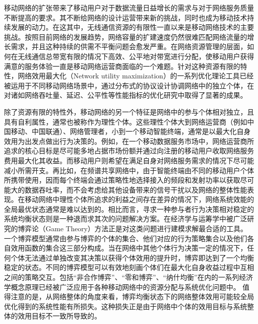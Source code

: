 
移动网络的扩张带来了移动用户对于数据流量日益增长的需求与对于网络服务质量不断提高的要求。其不断给网络的设计运营带来新的挑战，同时也成为移动技术持续发展的动力。在这其中，无线通信资源的有限性一直以来是移动网络技术的主要挑战。按照目前网络的发展趋势，网络容量的扩建速度仍然很难匹配网络流量的增长需求，并且这种持续的供需不平衡问题会愈发严重。在网络资源管理的层面，如何在无线通信总带宽有限的情况下高效、公平地对带宽进行分配，使移动用户获得满意的服务体验一直是移动网络运营商面临的一个难题。针对这种资源有限的特性，网络效用最大化（Network utility maximization）的一系列优化理论工具已经被运用于不同移动网络场景中，通过分布式的协议设计协调网络中的独立个体，在对诸如网络吞吐量、延迟、公平性等性能指标的优化研究中取得了显著的成果\cite{NET}。

除了资源有限的特性外，移动网络的另一个特征是网络中的参与个体相对独立，且具有自利属性，通常也被称作为理性个体。这些理性个体大到网络运营商（例如中国移动、中国联通）、网络管理者，小到一个移动智能终端，通常是以最大化自身效用为出发点做出行为决策的。例如，在一个移动数据服务市场中，网络运营商所追求的核心目标是尽可能多地占据市场份额并通过向注册的移动用户收取网络服务费用最大化其收益。而移动用户则希望在满足自身对网络服务需求的情况下尽可能减小所需开支。再比如，在频谱共享网络中，由于智能终端由不同的移动用户个体所携带使用，因而每个终端会通过策略性地选择接入的频段和发射功率以获取尽可能大的数据吞吐率，而不会考虑给其他设备带来的信号干扰以及网络的整体性能表现。在移动网络中理性个体所追求的利益之间存在差异的情况下，网络系统效能的全局最优状态通常是难以达到的。相比而言，寻求一种参与者行为决策相对稳定的系统均衡状态则是一种退而求其次的问题解决方案。在经济学与运筹学中被广泛研究的博弈论（Game Theory）方法正是对这类问题进行建模求解最合适的工具。一个博弈模型通常由参与博弈的个体的集合、他们对应的行为策略集合以及他们各自效用函数的集合这三部分构成。当在网络中其他个体行为决策一定的情况下，任何个体无法通过单独改变其决策以获得个体效用的提升时，博弈即达到了一个均衡稳定的状态。不同的博弈模型可以有效地刻画个体们在最大化自身收益过程中互相之间的策略交互。包括“非合作博弈”、“零和博弈”、“纳什均衡”在内的一系列经济学概念原理\cite{osborne}已经被广泛应用于各种移动网络中的资源分配与系统优化问题中\cite{han2012game}。
值得注意的是，从网络整体的角度来看，博弈均衡状态下的网络整体效用可能较全局优化得到的系统性能有所损失。这种损失正是由于网络中个体的效用目标与系统整体的效用目标不一致所导致的。

